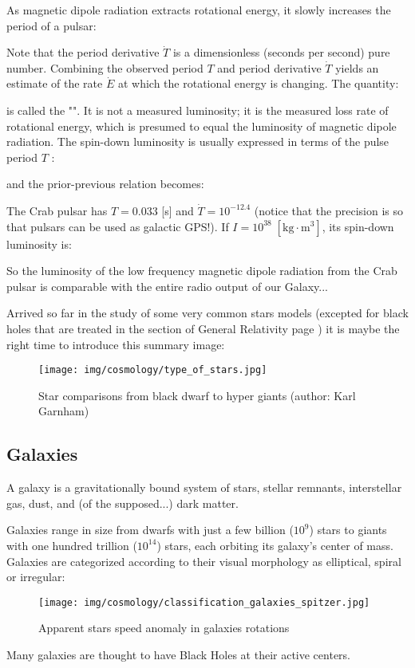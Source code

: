 	As magnetic dipole radiation extracts rotational energy, it slowly increases the period of a pulsar:
	
	Note that the period derivative $\dot{T}$ is a dimensionless (seconds per second) pure number. Combining the observed period $T$ and period derivative $\dot{T}$ yields an estimate of the rate $\dot{E}$ at which the rotational energy is changing. The quantity:
	
	is called the "". It is not a measured luminosity; it is the measured loss rate of rotational energy, which is presumed to equal the luminosity of magnetic dipole radiation. The spin-down luminosity is usually expressed in terms of the pulse period $T$ :
	
	and the prior-previous relation becomes:
	
	The Crab pulsar has $T=0.033$ [s] and $\dot{T}=10^{-12.4}$ (notice that the precision is so that pulsars can be used as galactic GPS!). If $I=10^{38}\; [\text{kg}\cdot \text{m}^{3}]$, its spin-down luminosity is:
	
	So the luminosity of the low frequency magnetic dipole radiation from the Crab pulsar is comparable with the entire radio output of our Galaxy...

	Arrived so far in the study of some very common stars models (excepted for black holes that are treated in the section of General Relativity page \pageref{black hole}) it is maybe the right time to introduce this summary image:
	\begin{figure}[H]
		\centering
		\texttt{[image: img/cosmology/type\_of\_stars.jpg]}
		\caption[Star comparisons from black dwarf to hyper giants]{Star comparisons from black dwarf to hyper giants (author: Karl Garnham)}
	\end{figure}
	
	\pagebreak
	\subsection{Galaxies}
	A galaxy is a gravitationally bound system of stars, stellar remnants, interstellar gas, dust, and (of the supposed...) dark matter. 

	Galaxies range in size from dwarfs with just a few billion ($10^9$) stars to giants with one hundred trillion ($10^{14}$) stars, each orbiting its galaxy's center of mass. Galaxies are categorized according to their visual morphology as elliptical, spiral or irregular:
	\begin{figure}[H]
		\centering
		\texttt{[image: img/cosmology/classification\_galaxies\_spitzer.jpg]}
		\caption{Apparent stars speed anomaly in galaxies rotations}
	\end{figure}
	 Many galaxies are thought to have Black Holes at their active centers. 

